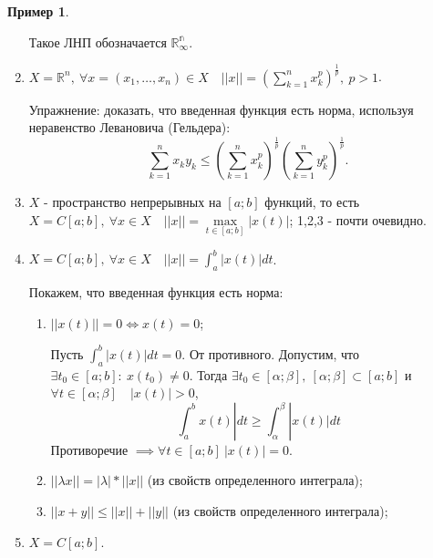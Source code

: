 \documentclass{report}
\theoremstyle{definition}
\newtheorem*{example}{Пример}
\begin{document}
\begin{example}
\begin{enumerate}
              \begin{center}
                  Такое ЛНП обозначается $\mathbb{R^n_\infty}$.
              \end{center}
        \item $X = \mathbb{R}^n, \ \forall x = (x_1,\ldots, x_n) \in X \quad ||x|| = (\sum_{k=1}^{n}x_k^p)^\frac{1}{p},
                  \ p > 1$.

              Упражнение: доказать, что введенная функция есть норма, используя неравенство Левановича (Гельдера):
              \begin{equation*}
                  \sum_{k=1}^{n}x_k y_k \leqslant (\sum_{k=1}^{n}x_k^p)^\frac{1}{p} (\sum_{k=1}^{n}y_k^p)^\frac{1}{p}.
              \end{equation*}

        \item $X$ - пространство непрерывных на $[a;b]$ функций, то есть $X = C[a;b], \ \forall x \in X
                  \quad ||x|| = \underset{t \in [a;b]}{\max}|x(t)|$; 1,2,3 - почти очевидно.

        \item $X = C[a;b], \ \forall x \in X \quad ||x|| = \int_{a}^{b}|x(t)|dt$.

              Покажем, что введенная функция есть норма:
              \begin{enumerate}
                  \item $||x(t)|| = 0 \iff x(t) = 0$;

                        Пусть $\int_{a}^{b}|x(t)|dt = 0$. От противного. Допустим, что $\exists t_0 \in [a;b]: \ x(t_0) \ne 0$.
                        Тогда $\exists t_0 \in [\alpha;\beta], \ [\alpha;\beta] \subset [a;b]$ и $\forall t \in [\alpha;\beta]
                            \quad |x(t)| > 0$,
                        \begin{equation*}
                            \int_{a}^{b}x(t)|dt \geqslant \int_{\alpha}^{\beta}|x(t)|dt
                        \end{equation*}
                        Противоречие $\implies \forall t \in [a;b] \ |x(t)| = 0$.

                  \item $|| \lambda x || = | \lambda | * || x ||$ (из свойств определенного интеграла);
                  \item $|| x+y || \leqslant || x || + || y ||$ (из свойств определенного интеграла);
              \end{enumerate}
        \item $X = C[a;b]$.
    \end{enumerate}
\end{example}
\end{document}
